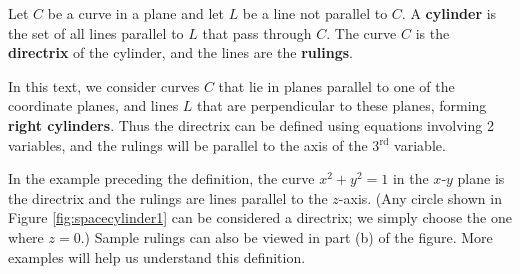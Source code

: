 {Let $C$ be a curve in a plane and let $L$ be a line not parallel to $C$. A \textbf{cylinder} is the set of all lines parallel to $L$ that pass through $C$. The curve $C$ is the \textbf{directrix} of the cylinder, and the lines are the \textbf{rulings}.
}

In this text, we consider curves $C$ that lie in planes parallel to one of the coordinate planes, and lines $L$ that are perpendicular to these planes, forming \textbf{right cylinders}. Thus the directrix can be defined using equations involving 2 variables, and the rulings will be parallel to the axis of the 3$^\text{rd}$ variable.

In the example preceding the definition, the curve $x^2+y^2=1$ in the $x$-$y$ plane is the directrix and the rulings are lines parallel to the $z$-axis. (Any circle shown in Figure \ref{fig:spacecylinder1} can be considered a directrix; we simply choose the one where $z=0$.) Sample rulings can also be viewed in part (b) of the figure. More examples will help us understand this definition.\\

